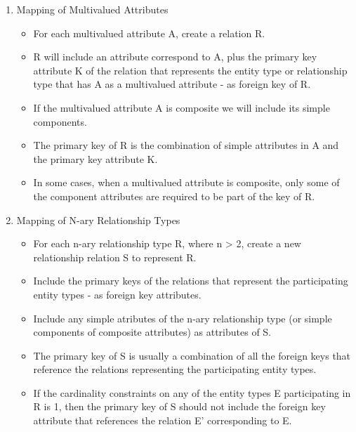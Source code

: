 \documentclass[10pt]{article}
\begin{document}
\begin{enumerate}
	\item Mapping of Multivalued Attributes 
		\begin{itemize}
			\item For each multivalued attribute A, create a relation R.
			\item R will include an attribute correspond to A, plus the primary key attribute K of the relation that represents the entity type or relationship type that has A as a multivalued attribute - as foreign key of R.
			\item If the multivalued attribute A is composite we will include its simple components.
			\item The primary key of R is the combination of simple attributes in A and the primary key attribute K.
			\item In some cases, when a multivalued attribute is composite, only some of the component attributes are required to be part of the key of R.
		\end{itemize}

	\item Mapping of N-ary Relationship Types
		\begin{itemize}
			\item For each n-ary relationship type R, where n > 2, create a new relationship relation S to represent R.
			\item Include the primary keys of the relations that represent the participating entity types - as foreign key attributes.
			\item Include any simple atributes of the n-ary relationship type (or simple components of composite attributes) as attributes of S.
			\item The primary key of S is usually a combination of all the foreign keys that reference the relations representing the participating entity types.
			\item If the cardinality constraints on any of the entity types E participating in R is 1, then the primary key of S should not include the foreign key attribute that references the relation E' corresponding to E. 
		\end{itemize}

\end{enumerate}
\end{document}
